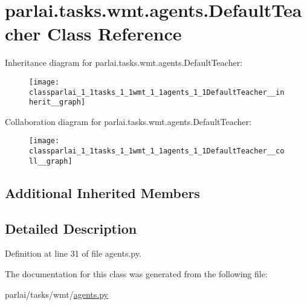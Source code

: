 \hypertarget{classparlai_1_1tasks_1_1wmt_1_1agents_1_1DefaultTeacher}{}\section{parlai.\+tasks.\+wmt.\+agents.\+Default\+Teacher Class Reference}
\label{classparlai_1_1tasks_1_1wmt_1_1agents_1_1DefaultTeacher}


Inheritance diagram for parlai.\+tasks.\+wmt.\+agents.\+Default\+Teacher\+:
\nopagebreak
\begin{figure}[H]
\begin{center}
\leavevmode
\texttt{[image: classparlai\_1\_1tasks\_1\_1wmt\_1\_1agents\_1\_1DefaultTeacher\_\_inherit\_\_graph]}
\end{center}
\end{figure}


Collaboration diagram for parlai.\+tasks.\+wmt.\+agents.\+Default\+Teacher\+:
\nopagebreak
\begin{figure}[H]
\begin{center}
\leavevmode
\texttt{[image: classparlai\_1\_1tasks\_1\_1wmt\_1\_1agents\_1\_1DefaultTeacher\_\_coll\_\_graph]}
\end{center}
\end{figure}
\subsection*{Additional Inherited Members}


\subsection{Detailed Description}


Definition at line 31 of file agents.\+py.



The documentation for this class was generated from the following file\+:\begin{DoxyCompactItemize}
\item 
parlai/tasks/wmt/\hyperlink{parlai_2tasks_2wmt_2agents_8py}{agents.\+py}\end{DoxyCompactItemize}
